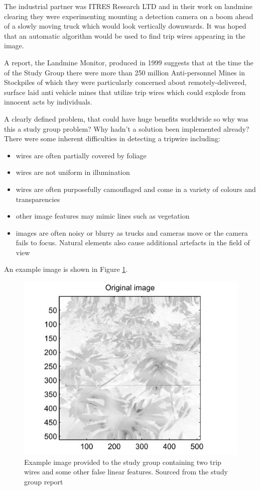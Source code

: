 \documentclass[11pt]{article} %
\begin{document}
The industrial partner was ITRES Research LTD and in their work on landmine clearing they were experimenting mounting a detection camera on a boom ahead of a slowly moving truck which would look vertically downwards. It was hoped that an automatic algorithm would be used to find trip wires appearing in the image. 
	
	A report, the Landmine Monitor, produced in 1999 \cite{landmine} suggests that at the time the of the Study Group there were more than 250 million Anti-personnel Mines in Stockpiles of which they were particularly concerned about remotely-delivered, surface laid anti vehicle mines that utilize trip wires which could explode from innocent acts by individuals. 
	
	A clearly defined  problem, that could have huge benefits worldwide so why was this a study group problem? Why hadn't a solution been implemented already? There were some inherent difficulties in detecting a tripwire including:
	\begin{itemize}
	\item wires are often partially covered by foliage
	\item wires are not uniform in illumination 
	\item wires are often purposefully camouflaged and come in a variety of colours and transparencies
	\item other image features may mimic lines such as vegetation 
	\item images are often noisy or blurry as trucks and cameras move or the camera fails to focus. Natural elements also cause additional artefacts in the field of view
	\end{itemize}
	An example image is shown in Figure \ref{fig:landmine-image}.
	
	\begin{figure}
		\centering
		\includegraphics[width=0.7\linewidth]{"Report_images/landmine image"}
		\caption{Example image provided to the study group containing two trip wires and some other false linear features. Sourced from the study group report \cite{Jessop}}
		\label{fig:landmine-image}
	\end{figure}
	
\end{document}
